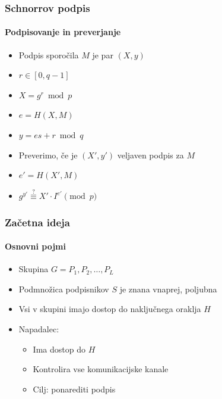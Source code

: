 \documentclass{beamer}    %
\begin{document}
\begin{frame}
    \frametitle{Schnorrov podpis}
    \framesubtitle{Podpisovanje in preverjanje}
    \begin{itemize}
        \item Podpis sporočila $M$ je par $(X, y)$
        \item $r \in [0, q-1]$
        \item $X = g^r \bmod{p}$
        \item $e = H(X, M)$
        \item $y = es + r \bmod{q}$
    \end{itemize}
    
    \vspace{1cm}
    \begin{itemize}
        \item Preverimo, če je $(X', y')$ veljaven podpis za $M$
        \item $e' = H(X', M)$
        \item $g^{y'} \stackrel{?}{\equiv} X' \cdot I^{e'} \pmod{p}$
    \end{itemize}
\end{frame}

\begin{frame}
    \frametitle{Začetna ideja}
    \framesubtitle{Osnovni pojmi}
    \begin{itemize}
        \item Skupina $G = P_1, P_2, \dots, P_L$
        \item Podmnožica podpisnikov $S$ je znana vnaprej, poljubna
        \item Vsi v skupini imajo dostop do naključnega oraklja $H$
        \item Napadalec: 
            \begin{itemize}
                \item Ima dostop do $H$
                \item Kontrolira vse komunikacijske kanale
                \item Cilj: ponarediti podpis
            \end{itemize}
    \end{itemize}
\end{frame}
\end{document}
